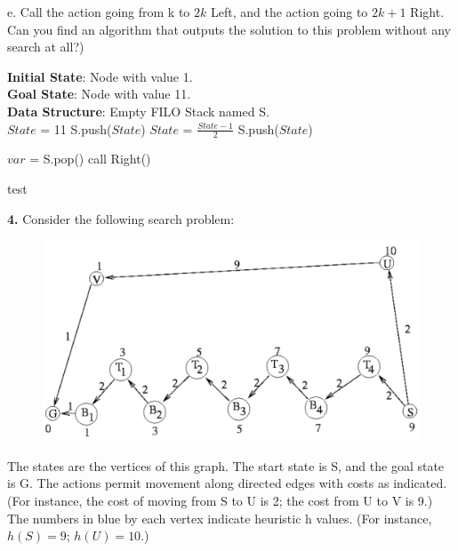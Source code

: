\documentclass{article}
\begin{document}
e. Call the action going from k to $2k$ Left, and the action going to $2k
+ 1$ Right. Can you find an algorithm that outputs the solution to this
problem without any search at all?) 
\begin{algorithm}[H]
  \textbf{Initial State}: Node with value 1. \\
  \textbf{Goal State}: Node with value 11. \\
  \textbf{Data Structure}: Empty FILO Stack named S. \\ 
  $State$ = 11\;
  S.push($State$)\;
   {
     {
      $State$ = $\frac{State - 1}{2}$\;
      S.push($State$)\;
    } 
  }
  
   {
    $var$ = S.pop()\;
     {
      call Right()\; 
    } 
  }
  \caption{test}
  \label{alg:ai-hwk1-3e}
\end{algorithm}
\vspace{1cm}
\textbf{4.} Consider the following search problem:
\begin{figure}[h]
  \centering
  \includegraphics[width=.7\textwidth]{hwk1-2.pdf}
\end{figure}

The states are the vertices of this graph. The start state is S, and
the goal state is G. The actions permit movement along directed edges
with costs as indicated. (For instance, the cost of moving from S to U
is 2; the cost from U to V is 9.) The numbers in blue by each vertex
indicate heuristic h values. (For instance, $h(S) = 9$; $h(U) = 10$.)
\end{document}
